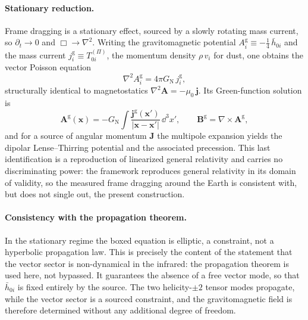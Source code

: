     \paragraph{Stationary reduction.}
      Frame dragging is a stationary effect, sourced by a slowly rotating mass current, so $\partial_t \to 0$ and
      $\Box \to \nabla^2$.
      Writing the gravitomagnetic potential $A^{\mathrm{g}}_i \equiv -\tfrac14\,\bar h_{0i}$ and the mass current
      $j^{\mathrm{g}}_i \equiv T^{(\Pi)}_{0i}$, the momentum density $\rho\,v_i$ for dust, one obtains the vector
      Poisson equation
      \[
        \nabla^2 A^{\mathrm{g}}_i = 4\pi G_{\mathrm{N}}\, j^{\mathrm{g}}_i,
      \]
      structurally identical to magnetostatics $\nabla^2 \mathbf{A} = -\mu_0\,\mathbf{j}$.
      Its Green-function solution is
      \[
        \mathbf{A}^{\mathrm{g}}(\mathbf{x})
        = -G_{\mathrm{N}} \int \frac{\mathbf{j}^{\mathrm{g}}(\mathbf{x}')}{|\mathbf{x}-\mathbf{x}'|}\,\dd^3 x',
        \qquad
        \mathbf{B}^{\mathrm{g}} = \nabla \times \mathbf{A}^{\mathrm{g}},
      \]
      and for a source of angular momentum $\mathbf{J}$ the multipole expansion yields the dipolar
      Lense--Thirring potential and the associated precession.
      This last identification is a reproduction of linearized general relativity and carries no discriminating
      power: the framework reproduces general relativity in its domain of validity, so the measured frame dragging
      around the Earth is consistent with, but does not single out, the present construction.

    \paragraph{Consistency with the propagation theorem.}
      In the stationary regime the boxed equation is elliptic, a constraint, not a hyperbolic propagation law.
      This is precisely the content of the statement that the vector sector is non-dynamical in the infrared:
      the propagation theorem is used here, not bypassed.
      It guarantees the absence of a free vector mode, so that $\bar h_{0i}$ is fixed entirely by the source.
      The two helicity-$\pm2$ tensor modes propagate, while the vector sector is a sourced constraint, and the
      gravitomagnetic field is therefore determined without any additional degree of freedom.

